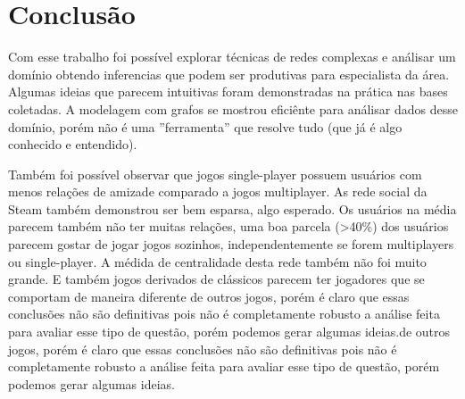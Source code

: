 \documentclass[12pt]{article}
\begin{document}


\section{Conclusão}

Com esse trabalho foi possível explorar técnicas de redes complexas e análisar um domínio obtendo inferencias que podem ser produtivas para especialista da área. Algumas ideias que parecem intuitivas foram demonstradas na prática nas bases coletadas. A modelagem com grafos se mostrou eficiênte para análisar dados desse domínio, porém não é uma ''ferramenta'' que resolve tudo (que já é algo conhecido e entendido).

Também foi possível observar que jogos single-player possuem usuários com menos relações de amizade comparado a jogos multiplayer. As rede social da Steam também demonstrou ser bem esparsa, algo esperado. Os usuários na média parecem também não ter muitas relações, uma boa parcela (>40\%) dos usuários parecem gostar de jogar jogos sozinhos, independentemente se forem multiplayers ou single-player. A médida de centralidade desta rede também não foi muito grande. E também jogos derivados de clássicos parecem ter jogadores que se comportam de maneira diferente de outros jogos, porém é claro que essas conclusões não são definitivas pois não é completamente robusto a análise feita para avaliar esse tipo de questão, porém podemos gerar algumas ideias.de outros jogos, porém é claro que essas conclusões não são definitivas pois não é completamente robusto a análise feita para avaliar esse tipo de questão, porém podemos gerar algumas ideias.
\end{document}
